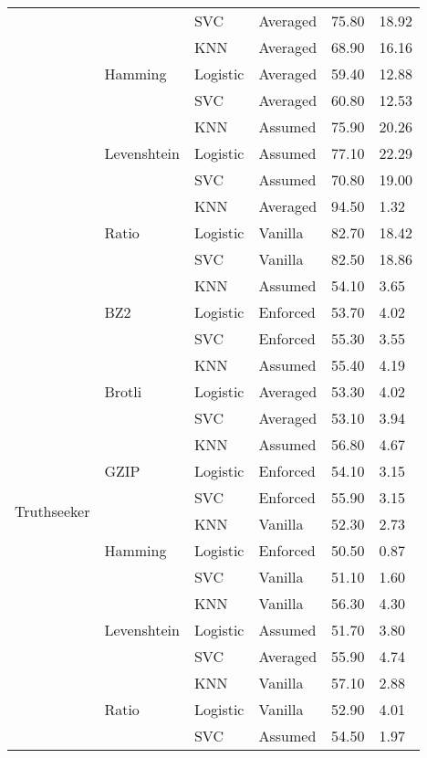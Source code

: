 \begin{tabularx}{\textwidth}{llllll}
\cline{3-6}
 &  & SVC & Averaged & 75.80 & 18.92 \\
\cline{2-6} \cline{3-6}
 & \multirow[t]{3}{*}{Hamming} & KNN & Averaged & 68.90 & 16.16 \\
\cline{3-6}
 &  & Logistic & Averaged & 59.40 & 12.88 \\
\cline{3-6}
 &  & SVC & Averaged & 60.80 & 12.53 \\
\cline{2-6} \cline{3-6}
 & \multirow[t]{3}{*}{Levenshtein} & KNN & Assumed & 75.90 & 20.26 \\
\cline{3-6}
 &  & Logistic & Assumed & 77.10 & 22.29 \\
\cline{3-6}
 &  & SVC & Assumed & 70.80 & 19.00 \\
\cline{2-6} \cline{3-6}
 & \multirow[t]{3}{*}{Ratio} & KNN & Averaged & 94.50 & 1.32 \\
\cline{3-6}
 &  & Logistic & Vanilla & 82.70 & 18.42 \\
\cline{3-6}
 &  & SVC & Vanilla & 82.50 & 18.86 \\
\cline{1-6} \cline{2-6} \cline{3-6}
\multirow[t]{18}{*}{Truthseeker} & \multirow[t]{3}{*}{BZ2} & KNN & Assumed & 54.10 & 3.65 \\
\cline{3-6}
 &  & Logistic & Enforced & 53.70 & 4.02 \\
\cline{3-6}
 &  & SVC & Enforced & 55.30 & 3.55 \\
\cline{2-6} \cline{3-6}
 & \multirow[t]{3}{*}{Brotli} & KNN & Assumed & 55.40 & 4.19 \\
\cline{3-6}
 &  & Logistic & Averaged & 53.30 & 4.02 \\
\cline{3-6}
 &  & SVC & Averaged & 53.10 & 3.94 \\
\cline{2-6} \cline{3-6}
 & \multirow[t]{3}{*}{GZIP} & KNN & Assumed & 56.80 & 4.67 \\
\cline{3-6}
 &  & Logistic & Enforced & 54.10 & 3.15 \\
\cline{3-6}
 &  & SVC & Enforced & 55.90 & 3.15 \\
\cline{2-6} \cline{3-6}
 & \multirow[t]{3}{*}{Hamming} & KNN & Vanilla & 52.30 & 2.73 \\
\cline{3-6}
 &  & Logistic & Enforced & 50.50 & 0.87 \\
\cline{3-6}
 &  & SVC & Vanilla & 51.10 & 1.60 \\
\cline{2-6} \cline{3-6}
 & \multirow[t]{3}{*}{Levenshtein} & KNN & Vanilla & 56.30 & 4.30 \\
\cline{3-6}
 &  & Logistic & Assumed & 51.70 & 3.80 \\
\cline{3-6}
 &  & SVC & Averaged & 55.90 & 4.74 \\
\cline{2-6} \cline{3-6}
 & \multirow[t]{3}{*}{Ratio} & KNN & Vanilla & 57.10 & 2.88 \\
\cline{3-6}
 &  & Logistic & Vanilla & 52.90 & 4.01 \\
\cline{3-6}
 &  & SVC & Assumed & 54.50 & 1.97 \\
\cline{1-6} \cline{2-6} \cline{3-6}
\bottomrule
\end{tabularx}
